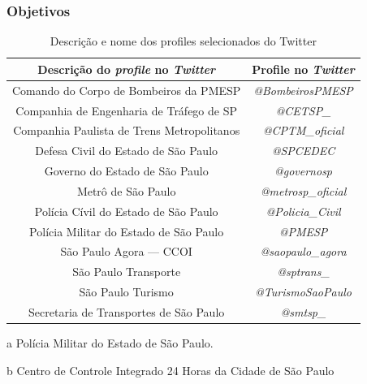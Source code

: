 \documentclass{beamer}
\begin{document}
\begin{frame}
\frametitle{Objetivos}
\begin{table}[!htb]
\centering
\caption{Descrição e nome dos profiles selecionados do Twitter}
	\label{tab:oficialProfiles}
\begin{adjustbox}{max height=28mm}
\begin{threeparttable}
\begin{tabular}{c|c}
\hline
\textbf{Descrição do \textit{profile} no \textit{Twitter}} & \textbf {Profile no \textit{Twitter}} \\ 
\hline
Comando do Corpo de Bombeiros da PMESP \tnote{a} & \textit{@BombeirosPMESP} \\ 
\hline
Companhia de Engenharia de Tráfego de SP & \textit{@CETSP\_} \\ 
\hline
Companhia Paulista de Trens Metropolitanos & \textit{@CPTM\_oficial} \\ 
\hline
Defesa Civil do Estado de São Paulo & \textit{@SPCEDEC} \\
\hline
Governo do Estado de São Paulo & \textit{@governosp} \\
\hline
Metrô de São Paulo & \textit{@metrosp\_oficial} \\
\hline
Polícia Cívil do Estado de São Paulo & \textit{@Policia\_Civil} \\  
\hline
Polícia Militar do Estado de São Paulo & \textit{@PMESP} \\ 
\hline
São Paulo Agora --- CCOI \tnote{b} & \textit{@saopaulo\_agora} \\
\hline
São Paulo Transporte & \textit{@sptrans\_} \\
\hline
São Paulo Turismo & \textit{@TurismoSaoPaulo} \\ 
\hline
Secretaria de Transportes de São Paulo & \textit{@smtsp\_} \\ 
\hline
\end{tabular}
\begin{tablenotes}
            \item[a] Polícia Militar do Estado de São Paulo.
            \item[b] Centro de Controle Integrado 24 Horas da Cidade de São Paulo
        \end{tablenotes}
\end{threeparttable}
\end{adjustbox}
\end{table}
\end{frame}
\end{document}

